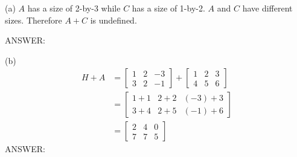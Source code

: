 
\SOLUTION

(a) 
$A$ has a size of 2-by-3 while $C$ has a size of 1-by-2.
$A$ and $C$ have different sizes.
Therefore $A + C$ is undefined.

ANSWER: 

(b)
\begin{align*}
H + A &= \begin{bmatrix}
         1 & 2 & -3 \\
         3 & 2 & -1 
         \end{bmatrix}
         + 
         \begin{bmatrix}
         1 & 2 & 3 \\
         4 & 5 & 6 
         \end{bmatrix}
         \\
      &= \begin{bmatrix}
         1 + 1     & 2 + 2   & (-3) + 3 \\
         3 + 4     & 2 + 5   & (-1) + 6 
         \end{bmatrix}
         \\
      &= \begin{bmatrix}
         2 & 4 & 0 \\
         7 & 7 & 5  
         \end{bmatrix}
\end{align*}
ANSWER: 

